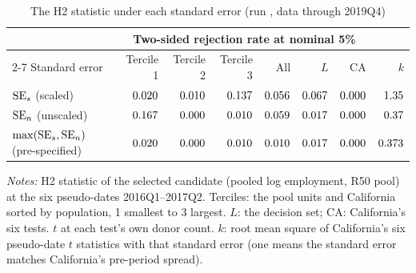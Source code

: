 \begin{table}[tbp]
\centering
\caption{The H2 statistic under each standard error (run , data through 2019Q4)}
\label{tab:sechoice}
\small
\begin{tabular}{@{}lrrrrrrr@{}}
\toprule
& \multicolumn{6}{c}{Two-sided rejection rate at nominal 5\%} & \\
\cmidrule(lr){2-7}
Standard error & Tercile 1 & Tercile 2 & Tercile 3 & All & $L$ & CA & $k$ \\
\midrule
$\mathrm{SE}_{s}$ (scaled) & $0.020$ & $0.010$ & $0.137$ & $0.056$ & $0.067$ & $0.000$ & $1.35$ \\
$\mathrm{SE}_{n}$ (unscaled) & $0.167$ & $0.000$ & $0.010$ & $0.059$ & $0.017$ & $0.000$ & $0.37$ \\
$\max(\mathrm{SE}_{s}, \mathrm{SE}_{n})$ (pre-specified) & $0.020$ & $0.000$ & $0.010$ & $0.010$ & $0.017$ & $0.000$ & $0.373$ \\
\bottomrule
\end{tabular}

\medskip
\begin{minipage}{\linewidth}\footnotesize
\emph{Notes:} H2 statistic of the selected candidate (pooled log employment, R50 pool) at the six
pseudo-dates 2016Q1--2017Q2. Terciles: the pool units and California sorted by population, 1
smallest to 3 largest. $L$: the decision set; CA: California's six tests. $t$ at each test's own
donor count. $k$: root mean square of California's six pseudo-date $t$ statistics with that
standard error (one means the standard error matches California's pre-period spread).
\end{minipage}
\end{table}


